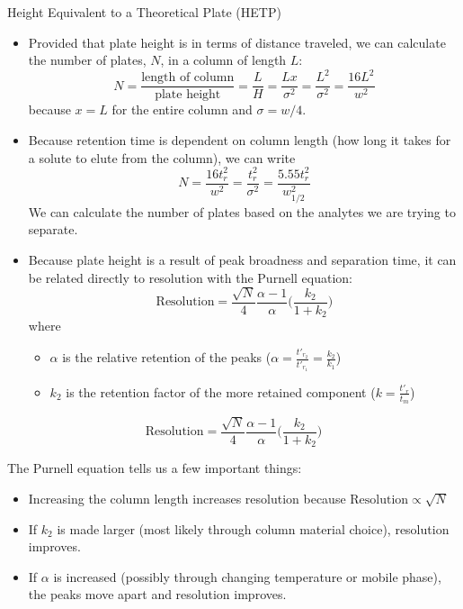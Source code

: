 \documentclass[notes=only]{beamer}
\begin{document}
\begin{frame}[allowframebreaks=1]{Height Equivalent to a Theoretical Plate (HETP)}
	\begin{itemize}
		\item Provided that plate height is in terms of distance
			traveled, we can calculate the number of plates, $N$, in
			a column of length $L$:
			\begin{equation*}
				N = \frac{\text{length of column}}{\text{plate
				height}} = \frac{L}{H} = \frac{Lx}{\sigma^2} =
				\frac{L^2}{\sigma^2} = \frac{16L^2}{w^2}
			\end{equation*}
			because $x = L$ for the entire column and $\sigma =
			w/4$.
		\item Because retention time is dependent on column length (how
			long it takes for a solute to elute from the column), we
			can write
			\begin{equation*}
				N = \frac{16t_r^2}{w^2} = \frac{t_r^2}{\sigma^2}
				= \frac{5.55t_r^2}{w^2_{1/2}}
			\end{equation*}
			We can calculate the number of plates based on the
			analytes we are trying to separate.
	\end{itemize}

	\framebreak

	\begin{itemize}
		\item Because plate height is a result of peak broadness and
			separation time, it can be related directly to
			resolution with the Purnell equation:
			\begin{equation*}
				\text{Resolution} = \frac{\sqrt{N}}{4}
				\frac{\alpha - 1}{\alpha} \bigg( \frac{k_2}{1 +
				k_2} \bigg)
			\end{equation*}
			where
			\begin{itemize}
				\item $\alpha$ is the relative retention of the
					peaks ($\alpha =
					\frac{t'_{r_2}}{t'_{r_1}} =
					\frac{k_2}{k_1}$)
				\item $k_2$ is the retention factor of the
					\alert{more retained} component ($k =
					\frac{t'_r}{t_m}$)
			\end{itemize}
	\end{itemize}

	\framebreak

	\begin{equation*}
		\text{Resolution} = \frac{\sqrt{N}}{4}
		\frac{\alpha - 1}{\alpha} \bigg( \frac{k_2}{1 +
		k_2} \bigg)
	\end{equation*}

	The Purnell equation tells us a few important things:
	\begin{itemize}
		\item Increasing the column length increases resolution because
			$\text{Resolution} \propto \sqrt{N}$
		\item If $k_2$ is made larger (most likely through column
			material choice), resolution improves.
		\item If $\alpha$ is increased (possibly through changing
			temperature or mobile phase), the peaks move apart and
			resolution improves.
	\end{itemize}
\end{frame}
\end{document}
